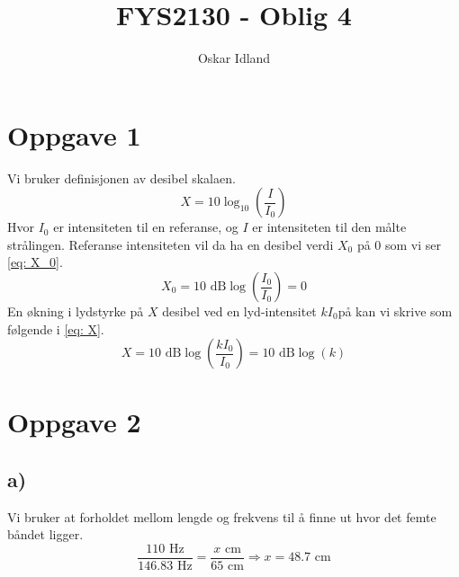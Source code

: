 \documentclass[norsk]{article}
\author{Oskar Idland}
\title{FYS2130 - Oblig 4}
\date{}
\begin{document}
\maketitle
\newpage
\section*{Oppgave 1}
Vi bruker definisjonen av desibel skalaen. 
\[
X = 10\log_{10}\left(\frac{I}{I_0}\right)
\] 
Hvor $I_0$ er intensiteten til en referanse, og $I$ er intensiteten til den målte strålingen. Referanse intensiteten vil da ha en desibel verdi $X_0$ på 0 som vi ser \cref{eq: X_0}. 
\begin{equation}\label{eq: X_0}
  X_0 = 10 \text{ dB} \log \left(\frac{I_0}{I_0}\right) = 0
\end{equation}
En økning i lydstyrke på $X$ desibel ved en lyd-intensitet $k I_0$på  kan vi skrive som følgende i \cref{eq: X}.
\begin{equation}\label{eq: X}
  X = 10 \text{ dB} \log \left(\frac{kI_0}{I_0}\right) = 10 \text{ dB} \log \left(k\right)
\end{equation}

\section*{Oppgave 2}
\subsection*{a)}
Vi bruker at forholdet mellom lengde og frekvens til å finne ut hvor det femte båndet ligger. 
\[
\frac{110 \text{ Hz}}{146.83 \text{ Hz}} = \frac{x \text{ cm}}{65 \text{ cm}} ⇒ x = 48.7 \text{ cm}
\]
\end{document}
